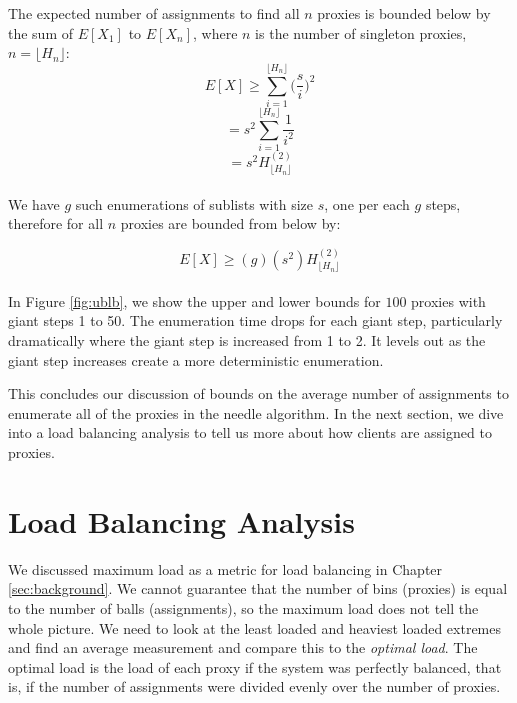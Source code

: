 The expected number of assignments to find all $n$ proxies is bounded below by the sum of $E[X_1]$ to $E[X_n]$, where $n$ is the number of singleton proxies,$n=\lfloor{H_n}\rfloor$:\\

$$E[X] \geq \sum_{i=1}^{\lfloor{H_n}\rfloor} \bigg(\frac{s}{i}\bigg)^2$$
$$= s^2 \sum_{i=1}^{\lfloor{H_n}\rfloor} \frac{1}{i^2}$$
$$= s^2H^{(2)}_{\lfloor{H_n}\rfloor}$$\\

We have $g$ such enumerations of sublists with size $s$, one per each $g$ steps, therefore for all $n$ proxies are bounded from below by:

$$E[X] \geq (g)(s^2)H^{(2)}_{\lfloor{H_n}\rfloor}$$\\

In Figure \ref{fig:ublb}, we show the upper and lower bounds for $100$ proxies with giant steps 1 to 50. The enumeration time drops for each giant step, particularly dramatically where the giant step is increased from 1 to 2. It levels out as the giant step increases create a more deterministic enumeration. 

This concludes our discussion of bounds on the average number of assignments to enumerate all of the proxies in the needle algorithm. In the next section, we dive into a load balancing analysis to tell us more about how clients are assigned to proxies.

\label{sec:lb}
\section{Load Balancing Analysis}

We discussed maximum load as a metric for load balancing in Chapter \ref{sec:background}. We cannot guarantee that the number of bins (proxies) is equal to the number of balls (assignments), so the maximum load does not tell the whole picture. We need to look at the least loaded and heaviest loaded extremes and find an average measurement and compare this to the \textit{optimal load}. The optimal load is the load of each proxy if the system was perfectly balanced, that is, if the number of assignments were divided evenly over the number of proxies.


